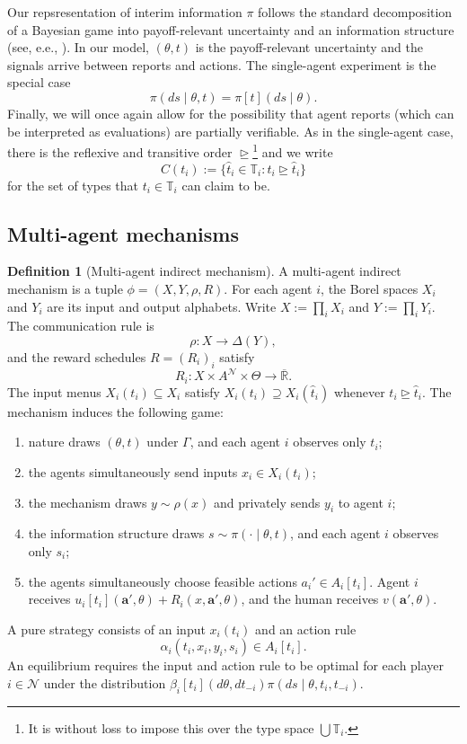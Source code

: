 \documentclass[12pt,reqno]{article}
\newcommand{\ba}{\mathbf{a}}
\newcommand{\Rbar}{\overline{\mathbb{R}}}
\theoremstyle{definition} \newtheorem{example}{Example}
\theoremstyle{definition} \newtheorem{condition}{Condition}
\theoremstyle{definition} \newtheorem{corollary}{Corollary}
\theoremstyle{definition} \newtheorem{claim}{Claim}
\theoremstyle{definition} \newtheorem{definition}{Definition}
\theoremstyle{definition} \newtheorem{conjecture}{Conjecture}
\theoremstyle{definition} \newtheorem{Lemma}{Lemma}
\theoremstyle{definition} \newtheorem{lemma}{Lemma}
\theoremstyle{plain} \newtheorem{theorem}{Theorem}
\theoremstyle{definition} \newtheorem{assumption}{Assumption}
\theoremstyle{definition} \newtheorem*{assumptionnonumber}{Assumption}
\theoremstyle{definition} \newtheorem*{theoremNoNumber}{Proposition}
\theoremstyle{definition}\newtheorem{proposition}{Proposition}
\theoremstyle{definition} \newtheorem{observation}{Observation}
\theoremstyle{definition} \newtheorem*{definitionNoNumber}{Definition}
\theoremstyle{definition} \newtheorem{Definition}{Definition}
\theoremstyle{definition} \newtheorem*{DefinitionNoNumber}{Definition}
\theoremstyle{definition} \newtheorem*{fact}{Fact}
\theoremstyle{definition} \newtheorem*{property}{Property}
\theoremstyle{definition} \newtheorem{remark}{Remark}
\theoremstyle{definition}\newtheorem{romanexampleinner}{Example}
\begin{document}
Our repsresentation of interim information $\pi$ follows the standard decomposition of a Bayesian game into payoff-relevant uncertainty and an information structure (see, e.e., \cite{bergemann2016bayes,bergemann2019information}). In our model, $(\theta,t)$ is the payoff-relevant uncertainty and the signals arrive between reports and actions. The single-agent experiment is the special case
\[
\pi(ds\mid\theta,t)=\pi[t](ds\mid\theta).
\]
Finally, we will once again allow for the possibility that agent reports (which can be interpreted as evaluations) are partially verifiable. As in the single-agent case, there is the reflexive and transitive order $\trianglerighteq$\footnote{It is without loss to impose this over the type space $\bigcup \mathbb{T}_i$.} and we write
\[
C(t_i):=\{\hat t_i \in\mathbb T_i: t_i \trianglerighteq\hat t_i\}
\]
for the set of types that $t_i \in \mathbb{T}_i$ can claim to be. 





\subsection{Multi-agent mechanisms}\label{sec:multi-mechanisms}

\begin{definition}[Multi-agent indirect mechanism]\label{def:mechanism}
A multi-agent indirect mechanism is a tuple $\phi=(X,Y,\rho,R)$. For each agent $i$, the Borel spaces $X_i$ and $Y_i$ are its input and output alphabets. Write $X:=\prod_iX_i$ and $Y:=\prod_iY_i$. The communication rule is
\[
\rho:X\to\Delta(Y),
\]
and the reward schedules $R=(R_i)_i$ satisfy
\[
R_i:X\times A^{\mathcal N}\times\Theta\to\Rbar.
\]
The input menus $X_i(t_i)\subseteq X_i$ satisfy $X_i(t_i)\supseteq X_i(\hat t_i)$ whenever $t_i\trianglerighteq\hat t_i$. The mechanism induces the following game:
\begin{enumerate}
    \item nature draws $(\theta,t)$ under $\Gamma$, and each agent $i$ observes only $t_i$;
    \item the agents simultaneously send inputs $x_i\in X_i(t_i)$;
    \item the mechanism draws $y\sim\rho(x)$ and privately sends $y_i$ to agent $i$;
    \item the information structure draws $s\sim\pi(\cdot\mid\theta,t)$, and each agent $i$ observes only $s_i$;
    \item the agents simultaneously choose feasible actions $a_i'\in A_i[t_i]$. Agent $i$ receives $u_i[t_i](\ba',\theta)+R_i(x,\ba',\theta)$, and the human receives $v(\ba',\theta)$.
\end{enumerate}
A pure strategy consists of an input $x_i(t_i)$ and an action rule
\[
\alpha_i(t_i,x_i,y_i,s_i)\in A_i[t_i].
\]
An equilibrium requires the input and action rule to be optimal for each player $i \in \mathcal{N}$ under the distribution $\beta_i[t_i](d\theta,dt_{-i})\pi(ds\mid\theta,t_i,t_{-i})$. 
\end{definition}
\end{document}
